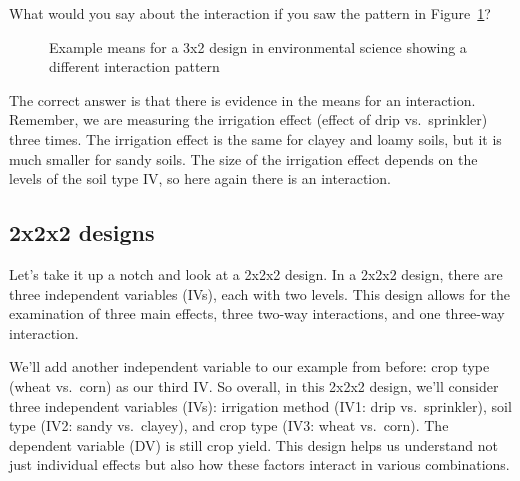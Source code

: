 \documentclass[
  letterpaper,
  DIV=11,
  numbers=noendperiod]{scrreprt}
\begin{document}
What would you say about the interaction if you saw the pattern in
Figure~\ref{fig-1123int}?

\begin{figure}


\caption{\label{fig-1123int}Example means for a 3x2 design in
environmental science showing a different interaction pattern}

\end{figure}%

The correct answer is that there is evidence in the means for an
interaction. Remember, we are measuring the irrigation effect (effect of
drip vs.~sprinkler) three times. The irrigation effect is the same for
clayey and loamy soils, but it is much smaller for sandy soils. The size
of the irrigation effect depends on the levels of the soil type IV, so
here again there is an interaction.

\subsection{2x2x2 designs}\label{x2x2-designs}

Let's take it up a notch and look at a 2x2x2 design. In a 2x2x2 design,
there are three independent variables (IVs), each with two levels. This
design allows for the examination of three main effects, three two-way
interactions, and one three-way interaction.

We'll add another independent variable to our example from before: crop
type (wheat vs.~corn) as our third IV. So overall, in this 2x2x2 design,
we'll consider three independent variables (IVs): irrigation method
(IV1: drip vs.~sprinkler), soil type (IV2: sandy vs.~clayey), and crop
type (IV3: wheat vs.~corn). The dependent variable (DV) is still crop
yield. This design helps us understand not just individual effects but
also how these factors interact in various combinations.
\end{document}
